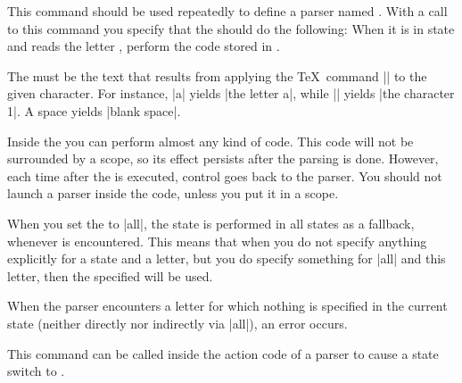 \begin{command}{\pgfparserdef{}}
    This command should be used repeatedly to define a parser named
    . With a call to this command you specify that the
     should do the following: When it is in state
     and reads the letter , perform the code
    stored in .

    The  must be the text that results from applying the
    \TeX\ command |\meaning| to the given character. For instance, |\meaning a|
    yields |the letter a|, while || yields |the character 1|. A space
    yields |blank space|.

    Inside the  you can perform almost any kind of code. This code
    will not be surrounded by a scope, so its effect persists after the parsing
    is done. However, each time after the  is executed, control
    goes back to the parser. You should not launch a parser inside the
     code, unless you put it in a scope.

    When you set the  to |all|, the state  is
    performed in all states as a fallback, whenever  is
    encountered. This means that when you do not specify anything explicitly
    for a state and a letter, but you do specify something for |all| and this
    letter, then the specified  will be used.

    When the parser encounters a letter for which nothing is specified in the
    current state (neither directly nor indirectly via |all|), an error occurs.
\end{command}

\begin{command}{\pgfparserswitch{}}
  This command can be called inside the action code of a parser to cause a
  state switch to .
\end{command}
